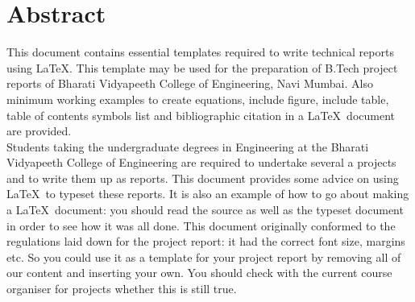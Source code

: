 \chapter*{Abstract}
%

This document contains essential templates required to write technical reports using \LaTeX. This template may be used for the preparation of B.Tech project reports of Bharati Vidyapeeth College of Engineering, Navi Mumbai. Also minimum working examples to create equations, include figure, include table, table of contents symbols list and bibliographic citation in a \LaTeX \ document are provided. \\

Students taking the undergraduate degrees in Engineering at the Bharati Vidyapeeth College of Engineering are required to undertake several a projects and to write them up as reports. This document provides some advice on using \LaTeX \ to typeset these reports. It is also an example of how to go about making a \LaTeX \ document: you should read the source as well as the typeset document in order to see how it was all done. This document originally conformed to the regulations laid down for the project report: it had the correct font size, margins etc. So you could use it as a template for your project report by removing all of our content and inserting your own. You should check with the current course organiser for projects whether this is still true. \\

\thispagestyle{plain}

